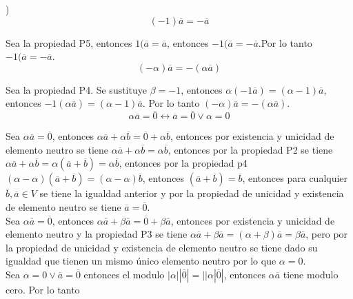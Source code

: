\documentclass[11pt,a4paper]{article}
\begin{document}
\begin{justify}
)\\

$$ (-1)\overline{a} = -\overline{a} $$

\noindent
Sea la propiedad P5, entonces $1(\overline{a}=\overline{a}$, entonces $-1(\overline{a}=-\overline{a}$.Por lo tanto $-1(\overline{a}=-\overline{a}$.\\

$$ (-\alpha)\overline{a} = -(\alpha \overline{a}) $$

\noindent
Sea la propiedad P4. Se sustituye $\beta = -1$, entonces $\alpha(-1\overline{a}) = (\alpha -1)\overline{a}$, entonces $-1(\alpha\overline{a}) = (\alpha -1)\overline{a}$. Por lo tanto  $(-\alpha)\overline{a} = -(\alpha \overline{a})$.\\

$$ \alpha \overline{a} = \overline{0} \leftrightarrow \overline{a} = \overline{0} \vee \alpha = 0 $$

\noindent 
Sea  $ \alpha\overline{a} = \overline{0} $, entonces $ \alpha\overline{a} + \alpha \overline{b} = \overline{0} + \alpha \overline{b}$, entonces por existencia y unicidad de elemento neutro se tiene $\alpha\overline{a} + \alpha \overline{b} =\alpha \overline{b}$, entonces por la propiedad P2 se tiene $\alpha\overline{a} + \alpha \overline{b} = \alpha (\overline{a}+\overline{b}) = \alpha \overline{b}$, entonces por la propiedad p4 $(\alpha-\alpha) (\overline{a}+\overline{b}) = (\alpha-\alpha) \overline{b}$, entonces $(\overline{a}+\overline{b}) =\overline{b}$, entonces para cualquier $\overline{b},\overline{a} \in V$ se tiene la igualdad anterior y por la propiedad de unicidad y existencia de elemento neutro se tiene $\overline{a} = \overline{0}$.\\

\noindent
Sea  $ \alpha\overline{a} = \overline{0} $, entonces  $ \alpha\overline{a}+ \beta \overline{a} = \overline{0} + \beta \overline{a}$, entonces por existencia y unicidad de elemento neutro y la propiedad P3 se tiene $\alpha\overline{a} + \beta \overline{a} =(\alpha + \beta) \overline{a}= \beta \overline{a}$, pero por la propiedad de unicidad y existencia de elemento neutro se tiene dado su igualdad que tienen un mismo único elemento neutro por lo que $\alpha = 0$.\\

\noindent
Sea $\alpha = 0 \vee \overline{a}=\overline{0}$ entonces el modulo $|\alpha||\overline{0}| = ||\alpha|\overline{0}| $, entonces $\alpha \overline{a}$ tiene modulo cero. Por lo tanto 


\end{justify}
\end{document}
